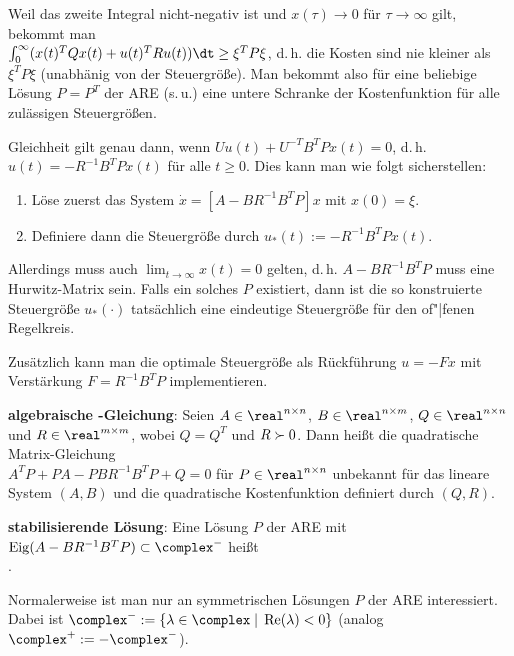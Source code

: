 Weil das zweite Integral nicht-negativ ist und $x(\tau) \to 0$ für $\tau \to \infty$ gilt,
bekommt man\\
$\int_0^\infty (x(t)^T Qx(t) + u(t)^T Ru(t)) \dt \ge \xi^T P\xi$,
d.\,h. die Kosten sind nie kleiner als $\xi^T P\xi$ (unabhänig von der Steuergröße).
Man bekommt also für eine beliebige Lösung $P = P^T$ der ARE (s.\,u.) eine untere Schranke der
Kostenfunktion für alle zulässigen Steuergrößen.

Gleichheit gilt genau dann,
wenn $Uu(t) + U^{-T} B^T P x(t) = 0$, d.\,h.
$u(t) = -R^{-1} B^T Px(t)$ für alle $t \ge 0$.
Dies kann man wie folgt sicherstellen:
\begin{enumerate}
    \item
    Löse zuerst das System $\dot{x} = [A - BR^{-1} B^T P]x$ mit $x(0) = \xi$.

    \item
    Definiere dann die Steuergröße durch $u_\ast(t) := -R^{-1} B^T P x(t)$.
\end{enumerate}
Allerdings muss auch $\lim_{t \to \infty} x(t) = 0$ gelten, d.\,h. $A - BR^{-1} B^T P$ muss
eine Hurwitz-Matrix sein.
Falls ein solches $P$ existiert, dann ist die so konstruierte Steuergröße $u_\ast(\cdot)$
tatsächlich eine eindeutige Steuergröße für den of"|fenen Regelkreis.

Zusätzlich kann man die optimale Steuergröße als Rückführung $u = -Fx$ mit Verstärkung
$F = R^{-1} B^T P$ implementieren.

\linie

\textbf{algebraische -Gleichung}:
Seien $A \in \real^{n \times n}$, $B \in \real^{n \times m}$,
$Q \in \real^{n \times n}$ und $R \in \real^{m \times m}$,
wobei $Q = Q^T$ und $R \succ 0$.
Dann heißt die quadratische Matrix-Gleichung\\
$A^T P + PA - PBR^{-1} B^T P + Q = 0$
für $P \in \real^{n \times n}$ unbekannt 
für das lineare System $(A, B)$ und die quadratische Kostenfunktion definiert durch $(Q, R)$.

\textbf{stabilisierende Lösung}:
Eine Lösung $P$ der ARE mit $\Eig(A - BR^{-1} B^T P) \subset \complex^-$ heißt\\
.

Normalerweise ist man nur an symmetrischen Lösungen $P$ der ARE interessiert.\\
Dabei ist $\complex^- := \{\lambda \in \complex \;|\; \Re(\lambda) < 0\}$
(analog $\complex^+ := -\complex^-$).

